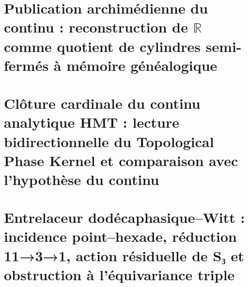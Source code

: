 \chapter{Publication archimédienne du continu : reconstruction de \texorpdfstring{\(\mathbb R\)}{R} comme quotient de cylindres semi-fermés à mémoire généalogique}
\label{chap:sucesor-102-18}

\begin{HMTSpiralIntegratedBody}

\end{HMTSpiralIntegratedBody}













\chapter{Clôture cardinale du continu analytique HMT : lecture bidirectionnelle du Topological Phase Kernel et comparaison avec l'hypothèse du continu}
\label{chap:sucesor-102-19}

















\chapter{Entrelaceur dodécaphasique–Witt : incidence point–hexade, réduction 11→3→1, action résiduelle de S₃ et obstruction à l'équivariance triple}
\label{chap:sucesor-102-20}
\begin{HMTScientificOwnerSubordinated}

\end{HMTScientificOwnerSubordinated}











